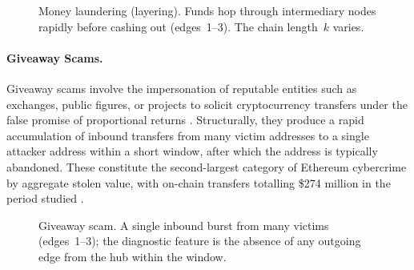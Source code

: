 \documentclass{thesisclass}
\begin{document}
\begin{figure}[ht]
  \centering
  \caption[Money laundering temporal motif]{Money laundering (layering). Funds hop
    through intermediary nodes rapidly before cashing out (edges~1--3).
    The chain length~$k$ varies.}
  \label{fig:motif-laundering}
\end{figure}

\paragraph{Giveaway Scams.}
Giveaway scams involve the impersonation of reputable entities such as exchanges, public figures, or projects to solicit cryptocurrency transfers under the false promise of proportional returns \citep{hornuf2025cybercrime}. Structurally, they produce a rapid accumulation of inbound transfers from many victim addresses to a single attacker address within a short window, after which the address is typically abandoned. These constitute the second-largest category of Ethereum cybercrime by aggregate stolen value, with on-chain transfers totalling \$274 million in the period studied \citep{hornuf2025cybercrime}.

\begin{figure}[ht]
  \centering
  \caption[Giveaway temporal motif]{Giveaway scam. A single inbound burst from
    many victims (edges~1--3); the diagnostic feature is the absence of any
    outgoing edge from the hub within the window.}
  \label{fig:motif-giveaway}
\end{figure}
\end{document}
